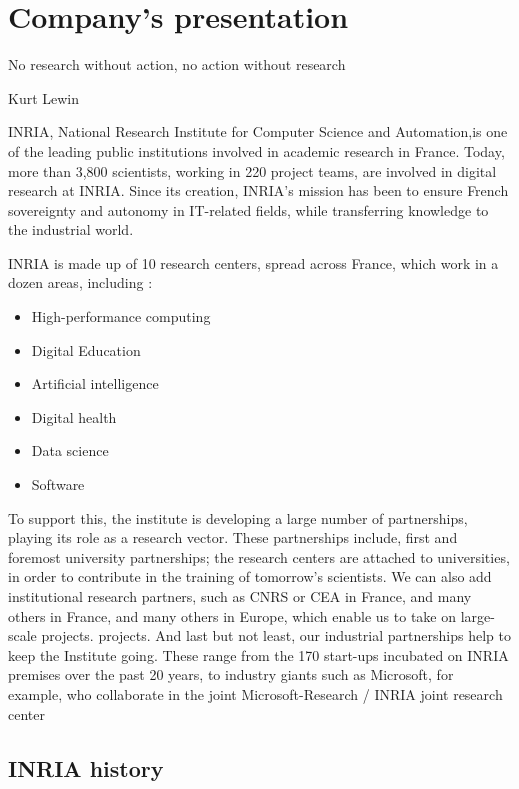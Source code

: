 \chapter{Company's presentation}
\label{chap:inria}

\epigraph{No research without action, no action without research}{Kurt Lewin}
INRIA, National Research Institute for Computer Science and Automation,is one of the leading public institutions involved in academic research in France. Today, more than 3,800 scientists, working in 220 project teams, are involved in digital research at INRIA. Since its creation, INRIA's mission has been to ensure French sovereignty and autonomy in IT-related fields, while transferring knowledge to the industrial world. 

INRIA is made up of 10 research centers, spread across France, which
work in a dozen areas, including :
\begin{multicols}{2}
\begin{itemize}
    \item High-performance computing
    \item Digital Education
    \item Artificial intelligence
    \item Digital health
    \item Data science
    \item Software
\end{itemize}
\end{multicols}

To support this, the institute is developing a large number of partnerships, playing its role as a research vector. These partnerships include, first and foremost university partnerships; the research centers are attached to universities, in order to contribute in the training of tomorrow's scientists. We can also add institutional research partners, such as CNRS or CEA in France, and many others in France, and many others in Europe, which enable us to take on large-scale projects. projects. And last but not least, our industrial partnerships help to keep the Institute going. These range from the 170 start-ups incubated on INRIA premises over the past 20 years, to industry giants such as Microsoft, for example, who collaborate in the joint Microsoft-Research / INRIA joint research center\cite{inria_microsoft}

\section{INRIA history}

